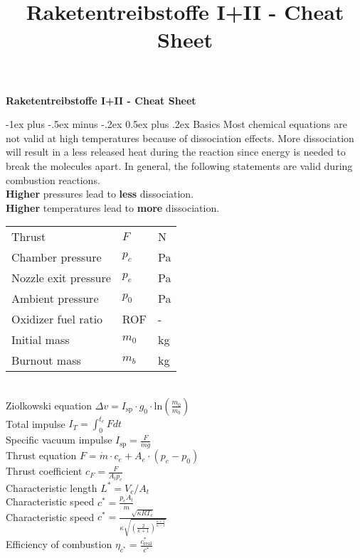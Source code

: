 \documentclass[10pt,landscape]{article}
\title{Raketentreibstoffe I+II - Cheat Sheet}
\makeatletter
\renewcommand{\section}{\@startsection{section}{1}{0mm}%
                                {-1ex plus -.5ex minus -.2ex}%
                                {0.5ex plus .2ex}%
                                {\normalfont\large\bfseries}}
\makeatother
\begin{document}
\raggedright
\footnotesize

\begin{center}
     \Large{\textbf{Raketentreibstoffe I+II - Cheat Sheet}} \\
\end{center}
\begin{multicols}{3}
\setlength{\premulticols}{1pt}
\setlength{\postmulticols}{1pt}
\setlength{\multicolsep}{1pt}
\setlength{\columnsep}{2pt}

\section{Basics}
Most chemical equations are not valid at high temperatures because of dissociation effects. More dissociation will result in a less released heat during the reaction since energy is needed to break the molecules apart. In general, the following statements are valid during combustion reactions.\\
\vspace{5pt}
\textbf{Higher} pressures lead to \textbf{less} dissociation.\\
\textbf{Higher} temperatures lead to \textbf{more} dissociation.\\
\vspace{7pt}
\begin{tabular}{lll}
	Thrust & $F$ & N \\
	Chamber pressure & $p_c$ & Pa \\
	Nozzle exit pressure & $p_e$ & Pa \\
	Ambient pressure & $p_0$ & Pa \\
	Oxidizer fuel ratio & ROF & - \\
	Initial mass & $m_0$ & kg \\
	Burnout mass & $m_b$ & kg \\
\end{tabular}\\
\vspace{5pt}
Ziolkowski equation $\Delta v=I_{\text{sp}}\cdot g_0 \cdot \text{ln}(\frac{m_0}{m_b})$\\
\vspace{7pt}
Total impulse $I_T = \int_{0}^{t_e} F dt$\\
Specific vacuum impulse $I_{\text{sp}}=\frac{F}{\dot{m}g}$\\
\vspace{7pt}
Thrust equation $F=\dot{m}\cdot c_e + A_e \cdot (p_e - p_0)$\\
Thrust coefficient $c_F = \frac{F}{A_t p_c}$\\
\vspace{7pt}
Characteristic length $L^*=V_c/A_t$\\
Characteristic speed $c^*=\frac{p_cA_t}{\dot{m}}$\\
Characteristic speed  $c^*=\frac{\sqrt{\kappa R T_c}}{\kappa \sqrt{(\frac{2}{\kappa+1})^\frac{\kappa+1}{\kappa-1}}}$\\
Efficiency of combustion $\eta_{c^*} = \frac{c^*_{\text{real}}}{c^*}$


\end{multicols}
\end{document}
